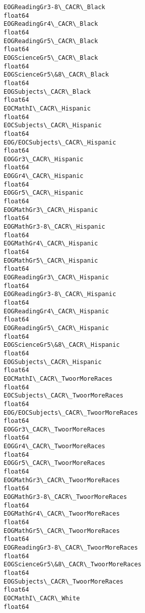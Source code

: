 \documentclass[11pt]{article}
\begin{document}
\begin{Verbatim}[commandchars=\\\{\}]
EOGReadingGr3-8\_CACR\_Black                                      float64
EOGReadingGr4\_CACR\_Black                                        float64
EOGReadingGr5\_CACR\_Black                                        float64
EOGScienceGr5\_CACR\_Black                                        float64
EOGScienceGr5\&8\_CACR\_Black                                      float64
EOGSubjects\_CACR\_Black                                          float64
EOCMathI\_CACR\_Hispanic                                          float64
EOCSubjects\_CACR\_Hispanic                                       float64
EOG/EOCSubjects\_CACR\_Hispanic                                   float64
EOGGr3\_CACR\_Hispanic                                            float64
EOGGr4\_CACR\_Hispanic                                            float64
EOGGr5\_CACR\_Hispanic                                            float64
EOGMathGr3\_CACR\_Hispanic                                        float64
EOGMathGr3-8\_CACR\_Hispanic                                      float64
EOGMathGr4\_CACR\_Hispanic                                        float64
EOGMathGr5\_CACR\_Hispanic                                        float64
EOGReadingGr3\_CACR\_Hispanic                                     float64
EOGReadingGr3-8\_CACR\_Hispanic                                   float64
EOGReadingGr4\_CACR\_Hispanic                                     float64
EOGReadingGr5\_CACR\_Hispanic                                     float64
EOGScienceGr5\&8\_CACR\_Hispanic                                   float64
EOGSubjects\_CACR\_Hispanic                                       float64
EOCMathI\_CACR\_TwoorMoreRaces                                    float64
EOCSubjects\_CACR\_TwoorMoreRaces                                 float64
EOG/EOCSubjects\_CACR\_TwoorMoreRaces                             float64
EOGGr3\_CACR\_TwoorMoreRaces                                      float64
EOGGr4\_CACR\_TwoorMoreRaces                                      float64
EOGGr5\_CACR\_TwoorMoreRaces                                      float64
EOGMathGr3\_CACR\_TwoorMoreRaces                                  float64
EOGMathGr3-8\_CACR\_TwoorMoreRaces                                float64
EOGMathGr4\_CACR\_TwoorMoreRaces                                  float64
EOGMathGr5\_CACR\_TwoorMoreRaces                                  float64
EOGReadingGr3-8\_CACR\_TwoorMoreRaces                             float64
EOGScienceGr5\&8\_CACR\_TwoorMoreRaces                             float64
EOGSubjects\_CACR\_TwoorMoreRaces                                 float64
EOCMathI\_CACR\_White                                             float64

\end{Verbatim}
\end{document}
